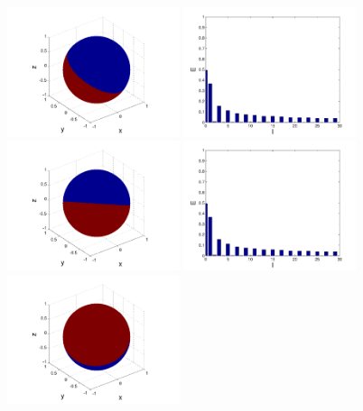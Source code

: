 \begin{refsection}
\begin{figure}
\includegraphics[width=0.45\textwidth]{kugel/kSpektrum/Kugel_2_1.pdf}
\includegraphics[width=0.45\textwidth]{kugel/kSpektrum/Kugel_2_2.pdf}
\includegraphics[width=0.45\textwidth]{kugel/kSpektrum/Kugel_3_1.pdf}
\includegraphics[width=0.45\textwidth]{kugel/kSpektrum/Kugel_3_2.pdf}
\includegraphics[width=0.45\textwidth]{kugel/kSpektrum/Kugel_4_1.pdf}

\end{figure}
\end{refsection}
